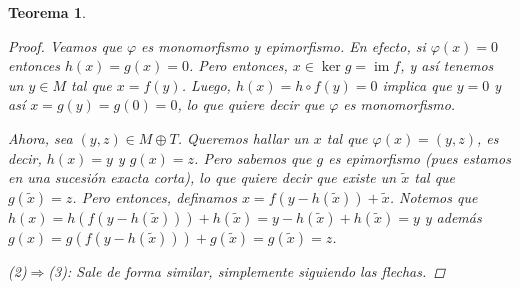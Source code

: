 \documentclass[12pt]{book}
\newtheorem{teo}{Teorema}[section]
\theoremstyle{definition}
\DeclareMathOperator{\im}{im}
\begin{document}
\begin{teo}
\begin{proof}
Veamos que $\varphi$ es monomorfismo y epimorfismo. En efecto, si $\varphi(x)=0$ entonces $h(x)=g(x)=0$. Pero entonces, $x\in \ker g = \im f$, y así tenemos un $y\in M$ tal que $x=f(y)$. Luego, $h(x) = h\circ f(y) = 0$ implica que $y=0$ y así $x=g(y)=g(0)=0$, lo que quiere decir que $\varphi$ es monomorfismo.

Ahora, sea $(y,z)\in M\oplus T$. Queremos hallar un $x$ tal que $\varphi(x)=(y,z)$, es decir, $h(x)=y$ y $g(x)=z$. Pero sabemos que $g$ es epimorfismo (pues estamos en una sucesión exacta corta), lo que quiere decir que existe un $\tilde{x}$ tal que $g(\tilde{x})=z$. Pero entonces, definamos $x = f(y-h(\tilde{x})) + \tilde{x}$. Notemos que $h(x)=h(f(y-h(\tilde{x}))) + h(\tilde{x}) = y - h(\tilde{x})+h(\tilde{x}) = y$ y además $g(x) = g(f(y-h(\tilde{x}))) + g(\tilde{x}) = g(\tilde{x}) = z$.

(\textit{2})$\Longrightarrow$(\textit{3}): Sale de forma similar, simplemente siguiendo las flechas.
\end{proof}
\end{teo}
\end{document}
